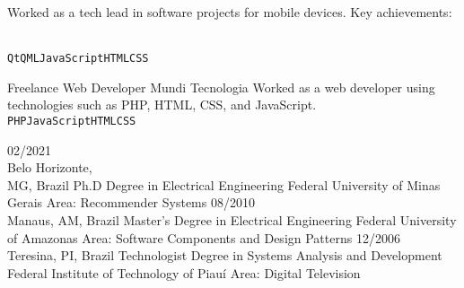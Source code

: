 \documentclass[9pt]{developercv} %
\begin{document}
\begin{entrylist}
  {
    Worked as a tech lead in software projects for mobile devices. Key achievements:\\
    \begin{contributionlist}
    \end{contributionlist}\\
    \texttt{Qt}\slashsep\texttt{QML}\slashsep\texttt{JavaScript}\slashsep\texttt{HTML}\slashsep\texttt{CSS}}
  {Freelance Web Developer}
  {Mundi Tecnologia}
  {Worked as a web developer using technologies such as PHP,
    HTML, CSS, and JavaScript.\\
    \texttt{PHP}\slashsep\texttt{JavaScript}\slashsep\texttt{HTML}\slashsep\texttt{CSS}}
\end{entrylist}



\begin{entrylist}
  \entry
  {02/2021\\\footnotesize{Belo Horizonte, \\MG, Brazil}}
  {Ph.D Degree in Electrical Engineering}
  {Federal University of Minas Gerais}
  {Area: Recommender Systems}
  \entry
  {08/2010\\\footnotesize{Manaus, AM, Brazil}}
  {Master's Degree in Electrical Engineering}
  {Federal University of Amazonas}
  {Area: Software Components and Design Patterns}
  \entry
  {12/2006\\\footnotesize{Teresina, PI, Brazil}}
  {Technologist Degree in Systems Analysis and Development}
  {Federal Institute of Technology of Piauí}
  {Area: Digital Television}
\end{entrylist}


\begin{minipage}[t]{0.3\textwidth}
  \vspace{-\baselineskip} %


  \begin{skills}
  \end{skills}
\end{minipage}
\end{document}
